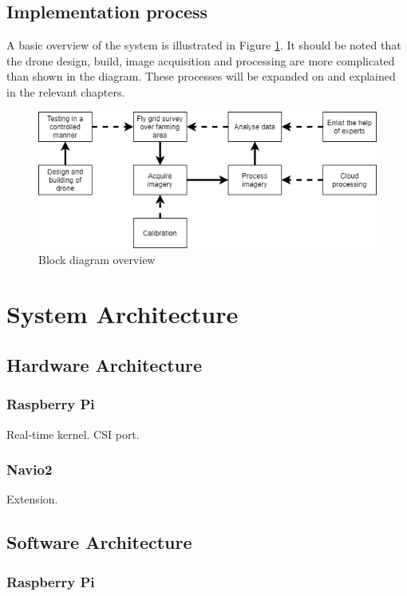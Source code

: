 \subsection{Implementation process}

A basic overview of the system is illustrated in Figure \ref{fig:overview}. It should be noted that the drone design, build, image acquisition and processing are more complicated than shown in the diagram. These processes will be expanded on and explained in the relevant chapters.

\begin{figure}[H]
\centering
\includegraphics[scale=0.6]{images/thesis_overview.png}
\caption{Block diagram overview}
\label{fig:overview}
\end{figure}


\section{System Architecture}

\subsection{Hardware Architecture}
\subsubsection{Raspberry Pi}

Real-time kernel. CSI port.

\subsubsection{Navio2}

Extension.

\subsection{Software Architecture}
\subsubsection{Raspberry Pi}

